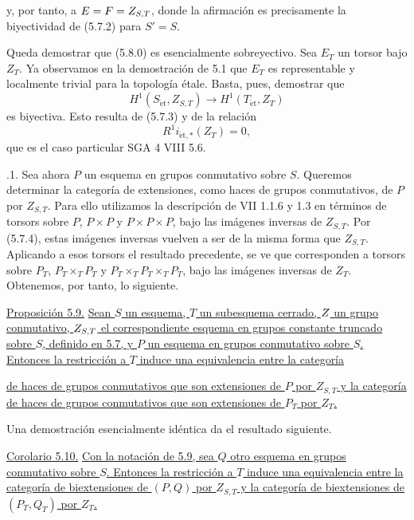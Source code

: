 
y, por tanto, a $E=F=\sisi{G_{S,T}}{Z_{S,T}}$, donde la afirmación es
precisamente la biyectividad de (5.7.2) para $S'=S$.

Queda demostrar que (5.8.0) es esencialmente sobreyectivo. Sea $E_T$
un torsor bajo $Z_T$. Ya observamos en la demostración de 5.1 que
$E_T$ es representable y localmente trivial para la topología étale.
Basta, pues, demostrar que
\[
 H^1(S_{\mathrm{\acute{e}t}},Z_{S,T})
 \longrightarrow H^1(T_{\mathrm{\acute{e}t}},Z_T)
\]
es biyectiva. Esto resulta de (5.7.3) y de la relación
\[
 R^1i_{\mathrm{\acute{e}t},*}(Z_T)=0,
\]
que es el caso particular SGA 4 VIII 5.6.

\medskip
{}.1. Sea ahora $P$ un esquema en grupos conmutativo sobre
$S$. Queremos determinar la categoría de extensiones, como haces de
grupos conmutativos, de $P$ por $Z_{S,T}$. Para ello utilizamos la
descripción de VII 1.1.6 y 1.3 en términos de torsors sobre $P$,
$P\times P$ y $P\times P\times P$, bajo las imágenes inversas de
$Z_{S,T}$. Por (5.7.4), estas imágenes inversas vuelven a ser de la
misma forma que $Z_{S,T}$. Aplicando a esos torsors el resultado
precedente, se ve que corresponden a torsors sobre $P_T$,
$P_T\times_TP_T$ y $P_T\times_TP_T\times_TP_T$, bajo las imágenes
inversas de $Z_T$. Obtenemos, por tanto, lo siguiente.

\medskip
\noindent\underline{Proposición 5.9.} \underline{Sean $S$ un esquema,
$T$ un subesquema cerrado, $\sisi{G}{Z}$ un grupo conmutativo,
$\sisi{G_{S,T}}{Z_{S,T}}$ el correspondiente esquema en grupos
constante truncado sobre $S$, definido en 5.7, y $P$ un esquema en
grupos conmutativo sobre $S$. Entonces la restricción a $T$ induce una
equivalencia entre la categoría}


\underline{de haces de grupos conmutativos que son extensiones de $P$
por $Z_{S,T}$ y la categoría de haces de grupos conmutativos que son
extensiones de $P_T$ por $Z_T$.}

Una demostración esencialmente idéntica da el resultado siguiente.

\medskip
\noindent\underline{Corolario 5.10.} \underline{Con la notación de
5.9, sea $Q$ otro esquema en grupos conmutativo sobre $S$. Entonces la
restricción a $T$ induce una equivalencia entre la categoría de
biextensiones de $(P,Q)$ por $Z_{S,T}$ y la categoría de
biextensiones de $(P_T,Q_T)$ por $Z_T$.}
